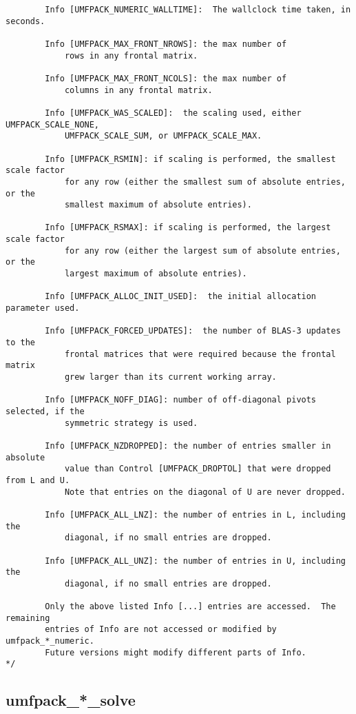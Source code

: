 \documentclass[11pt]{article}
\begin{document}
{\begin{verbatim}
        Info [UMFPACK_NUMERIC_WALLTIME]:  The wallclock time taken, in seconds.

        Info [UMFPACK_MAX_FRONT_NROWS]: the max number of
            rows in any frontal matrix.

        Info [UMFPACK_MAX_FRONT_NCOLS]: the max number of
            columns in any frontal matrix.

        Info [UMFPACK_WAS_SCALED]:  the scaling used, either UMFPACK_SCALE_NONE,
            UMFPACK_SCALE_SUM, or UMFPACK_SCALE_MAX.

        Info [UMFPACK_RSMIN]: if scaling is performed, the smallest scale factor
            for any row (either the smallest sum of absolute entries, or the
            smallest maximum of absolute entries).

        Info [UMFPACK_RSMAX]: if scaling is performed, the largest scale factor
            for any row (either the largest sum of absolute entries, or the
            largest maximum of absolute entries).

        Info [UMFPACK_ALLOC_INIT_USED]:  the initial allocation parameter used.

        Info [UMFPACK_FORCED_UPDATES]:  the number of BLAS-3 updates to the
            frontal matrices that were required because the frontal matrix
            grew larger than its current working array.

        Info [UMFPACK_NOFF_DIAG]: number of off-diagonal pivots selected, if the
            symmetric strategy is used.

        Info [UMFPACK_NZDROPPED]: the number of entries smaller in absolute
            value than Control [UMFPACK_DROPTOL] that were dropped from L and U.
            Note that entries on the diagonal of U are never dropped.

        Info [UMFPACK_ALL_LNZ]: the number of entries in L, including the
            diagonal, if no small entries are dropped.

        Info [UMFPACK_ALL_UNZ]: the number of entries in U, including the
            diagonal, if no small entries are dropped.

        Only the above listed Info [...] entries are accessed.  The remaining
        entries of Info are not accessed or modified by umfpack_*_numeric.
        Future versions might modify different parts of Info.
*/

\end{verbatim}
}

\newpage
\subsection{umfpack\_*\_solve}
\end{document}
